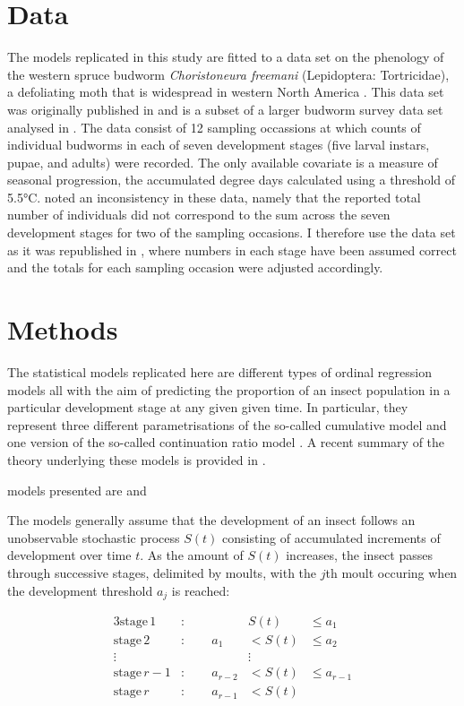 \section{Data}
The models replicated in this study are fitted to a data set on the phenology of the western spruce budworm \emph{Choristoneura freemani} (Lepidoptera: Tortricidae), a defoliating moth that is widespread in western North America \citep{brookes1987western}. This data set was originally published in \citep{dennis1986stochastic} and is a subset of a larger budworm survey data set analysed in \citep{kemp1986}. The data consist of 12 sampling occassions at which counts of individual budworms in each of seven development stages (five larval instars, pupae, and adults) were recorded. The only available covariate is a measure of seasonal progression, the accumulated degree days calculated using a threshold of 5.5°C. \citet{candy1991modeling} noted an inconsistency in these data, namely that the reported total number of individuals did not correspond to the sum across the seven development stages for two of the sampling occasions. I therefore use the data set as it was republished in \citet{candy1990biology}, where numbers in each stage have been assumed correct and the totals for each sampling occasion were adjusted accordingly.

\section{Methods}
The statistical models replicated here are different types of ordinal regression models \citep{agresti} all with the aim of predicting the proportion of an insect population in a particular development stage at any given given time. In particular, they represent three different parametrisations of the so-called cumulative model and one version of the so-called continuation ratio model \citep{}. A recent summary of the theory underlying these models is provided in \citep{buerkner?}.


models presented are  \citet{dennis1986stochastic} and \citet{candy1991modeling} 

The models generally assume that the development of an insect follows an unobservable stochastic process $S(t)$ consisting of accumulated increments of development over time $t$. As the amount of $S(t)$ increases, the insect passes through successive stages, delimited by moults, with the $j$th moult occuring when the development threshold $a_j$ is reached:

\begin{alignat*}{3}
  \mathrm{stage}\,1&:\qquad {}&   S(t) & \leq a_1 \\
  \mathrm{stage}\,2&:\qquad  a_1&< S(t) & \leq a_2 \\
  \vdots & &\vdots \\
  \mathrm{stage}\,r-1&:\qquad  a_{r-2}&< S(t) & \leq a_{r-1} \\
  \mathrm{stage}\,r&:\qquad  a_{r-1}&< S(t) 
\end{alignat*}

